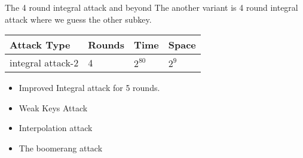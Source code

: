 \begin{frame}{The 4 round integral attack and beyond}
    The another variant is 4 round integral attack where we guess the other subkey.
\begin{table}[h]
\centering
\begin{tabular}{|l|l|l|l|}
\hline
Attack Type     & Rounds & Time     & Space \\ \hline
integral attack-2 & 4      & $2^{80}$ & $2^9$ \\ \hline
\end{tabular}
\end{table}
\begin{itemize}
    \item Improved Integral attack for 5 rounds.
    \item Weak Keys Attack
    \item Interpolation attack
    \item The boomerang attack
\end{itemize}
\end{frame}
